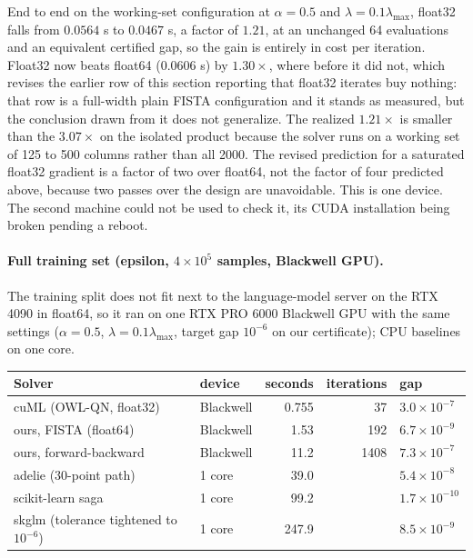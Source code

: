 \documentclass[11pt]{article}
\begin{document}
End to end on the working-set configuration at $\alpha=0.5$ and
$\lambda=0.1\lambda_{\max}$, float32 falls from $0.0564$ s to $0.0467$ s, a
factor of $1.21$, at an unchanged 64 evaluations and an equivalent certified
gap, so the gain is entirely in cost per iteration. Float32 now beats float64
($0.0606$ s) by $1.30\times$, where before it did not, which revises the earlier
row of this section reporting that float32 iterates buy nothing: that row is a
full-width plain FISTA configuration and it stands as measured, but the
conclusion drawn from it does not generalize. The realized $1.21\times$ is
smaller than the $3.07\times$ on the isolated product because the solver runs on
a working set of 125 to 500 columns rather than all 2000. The revised prediction
for a saturated float32 gradient is a factor of two over float64, not the factor
of four predicted above, because two passes over the design are unavoidable.
This is one device. The second machine could not be used to check it, its CUDA
installation being broken pending a reboot.

\paragraph{Full training set (epsilon, $4\times10^5$ samples, Blackwell GPU).}
The training split does not fit next to the language-model server on the
RTX 4090 in float64, so it ran on one RTX PRO 6000 Blackwell GPU with the same
settings ($\alpha=0.5$, $\lambda=0.1\lambda_{\max}$, target gap $10^{-6}$ on our
certificate); CPU baselines on one core. 

\begin{center}
\small
\begin{tabular}{llrrl}
\toprule
Solver & device & seconds & iterations & gap \\
\midrule
cuML (OWL-QN, float32) & Blackwell & 0.755 & 37 & $3.0\times10^{-7}$ \\
ours, FISTA (float64) & Blackwell & 1.53 & 192 & $6.7\times10^{-9}$ \\
ours, forward-backward & Blackwell & 11.2 & 1408 & $7.3\times10^{-7}$ \\
adelie (30-point path) & 1 core & 39.0 & & $5.4\times10^{-8}$ \\
scikit-learn saga & 1 core & 99.2 & & $1.7\times10^{-10}$ \\
skglm (tolerance tightened to $10^{-6}$) & 1 core & 247.9 & & $8.5\times10^{-9}$ \\
\bottomrule
\end{tabular}
\end{center}
\end{document}
